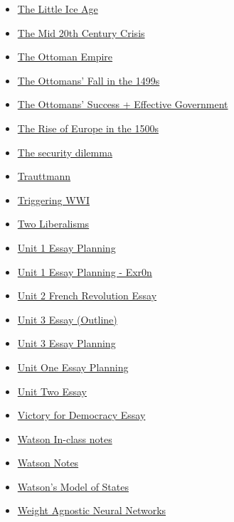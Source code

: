 \documentclass[11pt]{article}
\begin{document}
\begin{itemize}
\begin{itemize}
\begin{itemize}
\item \href{history/history10/KBhHIST201LittleIceAge.org}{The Little Ice Age}
\item \href{history/history10/KBhHIST201ColdWar.org}{The Mid 20th Century Crisis}
\item \href{history/history10/KBrefOttomanEmpire.org}{The Ottoman Empire}
\item \href{history/history10/KBhHIST201OttomansFall1500s.org}{The Ottomans' Fall in the 1499s}
\item \href{history/history10/KBhHIST201OttomansSuccess.org}{The Ottomans' Success + Effective Government}
\item \href{history/history10/KBhHIST201RiseOfEurope1500.org}{The Rise of Europe in the 1500s}
\item \href{history/history10/KBrefSecurityDilemma.org}{The security dilemma}
\item \href{history/history10/KBhHIST201Trauttmann.org}{Trauttmann}
\item \href{history/history10/KBhHIST201WWITriggering.org}{Triggering WWI}
\item \href{history/history10/KBhHIST201Liberalism.org}{Two Liberalisms}
\item \href{history/history10/KBhHIST201Unit1EssayJack.org}{Unit 1 Essay Planning}
\item \href{history/history10/KBe20hist201Unit1Essay.org}{Unit 1 Essay Planning - Exr0n}
\item \href{history/history10/KBhHIST201Unit2EssayJack.org}{Unit 2 French Revolution Essay}
\item \href{history/history10/KBhHIST201Unit3EssayOutlineForSushuJack.org}{Unit 3 Essay (Outline)}
\item \href{history/history10/KBxUnit3EssayPlanning.org}{Unit 3 Essay Planning}
\item \href{history/history10/KBxUnitOneEssayPlanning.org}{Unit One Essay Planning}
\item \href{history/history10/KBUnitTwoEssayHux.org}{Unit Two Essay}
\item \href{history/history10/KBe21hist201retVictoryForDemocracy.org}{Victory for Democracy Essay}
\item \href{history/history10/KBWatsonInClassNotes.org}{Watson In-class notes}
\item \href{history/history10/KB20200825121700.org}{Watson Notes}
\item \href{history/history10/KBhHIST201Watson.org}{Watson's Model of States}
\item \href{history/history10/KBWeightAgnosticNN.org}{Weight Agnostic Neural Networks}

\end{itemize}
\end{itemize}
\end{itemize}
\end{document}
